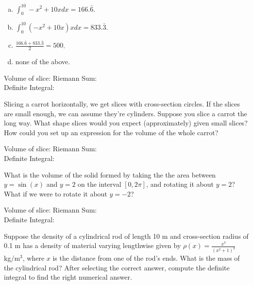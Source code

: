 \documentclass[answers]{exam}
\begin{document}
\begin{questions}
\begin{enumerate}[(a)]
	\item $\int_0^{10} -x^2 +10x dx = 166.\bar{6}.$	
	
	\item $\int_0^{10} (-x^2 +10x)x dx = 833.\bar{3}.$	
	
	
	\item $\frac{166.\bar{6}+833.\bar{3}}{2} = 500$.
	
	
	\item none of the above.
	
	
\end{enumerate}

Volume of slice: \hspace{2in} Riemann Sum:\\

Definite Integral: \\

\vspace{1in}

\question Slicing a carrot horizontally, we get slices with cross-section circles. If the slices are small enough, we can assume they're cylinders. Suppose you slice a carrot the long way.  What shape slices would you expect (approximately) given small slices?  How could you set up an expression for the volume of the whole carrot?

Volume of slice: \hspace{2in} Riemann Sum:\\

Definite Integral: \\
	
\vspace{1in}

\question What is the volume of the solid formed by taking the the area between $y = \sin(x)$ and $y = 2$ on the interval $[0, 2\pi]$, and rotating it about $y = 2$? What if we were to rotate it about $y = -2$?

Volume of slice: \hspace{2in} Riemann Sum:\\

Definite Integral: \\


\vspace{1in}

\question Suppose the density of a cylindrical rod of length 10 m and cross-section radius of 0.1 m has a density of material varying lengthwise given by $\rho(x) = \frac{x^3}{(x^2+1)^3}$ kg/m$^3$, where $x$ is the distance from one of the rod's ends. What is the mass of the cylindrical rod? After selecting the correct answer, compute the definite integral to find the right numerical answer.



\end{questions}
\end{document}
